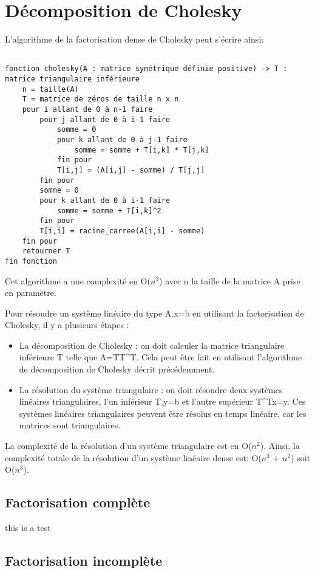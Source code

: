 

\section{Décomposition de Cholesky}
\label{sec:decomp_cholesky}

L'algorithme de la factorisation dense de Cholesky peut s'écrire ainsi:
\begin{verbatim}

fonction cholesky(A : matrice symétrique définie positive) -> T : matrice triangulaire inférieure
    n = taille(A)
    T = matrice de zéros de taille n x n
    pour i allant de 0 à n-1 faire
        pour j allant de 0 à i-1 faire
            somme = 0
            pour k allant de 0 à j-1 faire
                somme = somme + T[i,k] * T[j,k]
            fin pour
            T[i,j] = (A[i,j] - somme) / T[j,j]
        fin pour
        somme = 0
        pour k allant de 0 à i-1 faire
            somme = somme + T[i,k]^2
        fin pour
        T[i,i] = racine_carree(A[i,i] - somme)
    fin pour
    retourner T
fin fonction

\end{verbatim}

Cet algorithme a une complexité en O($n^3$) avec n la taille de la matrice A prise en paramètre.

Pour résoudre un système linéaire du type A.x=b en utilisant la factorisation de Cholesky, il y a plusieurs étapes : 
\begin{itemize}
    \item La décomposition de Cholesky : on doit calculer la matrice triangulaire inférieure T telle que A=TT^T. Cela peut être fait en utilisant l'algorithme de décomposition de Cholesky décrit précédemment.
    \item La résolution du système triangulaire : on doit résoudre deux systèmes linéaires triangulaires, l'un inférieur T.y=b et l'autre supérieur T^Tx=y. Ces systèmes linéaires triangulaires peuvent être résolus en temps linéaire, car les matrices sont triangulaires. 
\end{itemize}
La complexité de la résolution d'un système triangulaire est en O($n^2$). Ainsi, la complexité totale de la résolution d'un système linéaire dense est: O($n^3$ + $n^2$) soit O($n^3$). 

\subsection{Factorisation complète}
\label{ssec:factor_compl}
this is a test
\subsection{Factorisation incomplète}
\label{ssec:factor_incompl}

